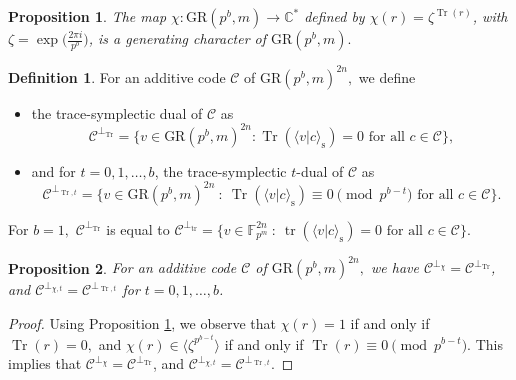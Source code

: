 \documentclass{article}
\DeclareMathOperator{\tr}{tr}
\DeclareMathOperator{\Tr}{Tr}
\newtheorem{prop}{Proposition}[section]
\theoremstyle{remark}
\theoremstyle{definition}
\newtheorem{defin}{Definition}[section]
\numberwithin{equation}{section}
\begin{document}
\begin{prop}\label{prop:charGR}\cite{shuqin} The map $\chi: \text{GR}(p^b,m) \to \mathbb{C}^*$ defined by
$\chi(r)=\zeta^{{\Tr}(r)}$, with $\zeta = \exp\bigl(\frac{2\pi i}{p^b}\bigr)$, is a generating character of  $\text{GR}(p^b,m).$
\end{prop}


\begin{defin} 
\label{def:trace_duals}
For an additive code $\mathcal{C}$ of $\text{GR}(p^b,m)^{2n},$  we define
\begin{itemize}
\item the trace-symplectic dual of $\mathcal{C}$ as
$$\mathcal{C}^{\perp_{{\Tr}}} = \{v \in \text{GR}(p^b,m)^{2n} : \Tr( \langle v | c\rangle_{\mathrm{s}}) = 0 \text{~for all~} c \in \mathcal{C}\},$$
\item and for $t = 0,1,\ldots,b$, the trace-symplectic $t$-dual of $\mathcal{C}$ as 
$$\mathcal{C}^{\perp_{\Tr,t}} = \{v \in \text{GR}(p^b,m)^{2n} ~:~ \Tr( \langle v | c\rangle_{\mathrm{s}}) \equiv 0 \!\!\! \pmod{p^{b-t}} \text{~for all~} c \in \mathcal{C}\}.$$
\end{itemize}
\end{defin}
For $b=1,$  $\mathcal{C}^{\perp_{{\Tr}}}$ is equal to 
$\mathcal{C}^{\perp_{{\tr}}} =\{v \in \mathbb{F}_{p^m}^{2n} ~:~ \tr(\langle v | c\rangle_{\mathrm{s}}) = 0 \text{ for all } c \in \mathcal{C}\}$.

\begin{prop}\label{prop:dualGR}  For an additive code $\mathcal{C}$ of $\text{GR}(p^b,m)^{2n},$ we have $\mathcal{C}^{\perp_\chi}=\mathcal{C}^{\perp_{{\Tr}}}$, and $\mathcal{C}^{\perp_{\chi,t}}=\mathcal{C}^{\perp_{\Tr,t}}$ for $t = 0,1,\ldots,b$.
\end{prop}
\begin{proof}Using  Proposition \ref{prop:charGR}, we observe that $\chi(r)=1$ if and only if ${\Tr}(r)=0,$ and $\chi(r) \in \langle \zeta^{p^{b-t}} \rangle $ if and only if ${\Tr}(r) \equiv 0 \pmod{p^{b-t}}$.  This implies that $\mathcal{C}^{\perp_\chi}=\mathcal{C}^{\perp_{{\Tr}}}$, and $\mathcal{C}^{\perp_{\chi,t}}=\mathcal{C}^{\perp_{\Tr,t}}.$
\end{proof} 
\end{document}

